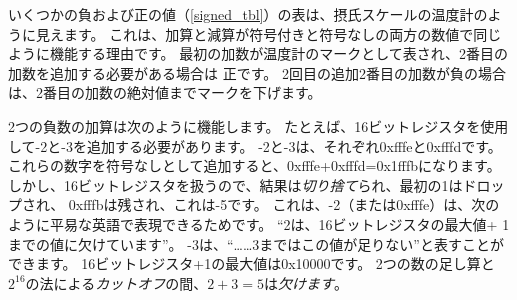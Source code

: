 いくつかの負および正の値（\ref{signed_tbl}）の表は、摂氏スケールの温度計のように見えます。
これは、加算と減算が符号付きと符号なしの両方の数値で同じように機能する理由です。
最初の加数が温度計のマークとして表され、2番目の加数を追加する必要がある場合は
正です。 
2回目の追加2番目の加数が負の場合は、2番目の加数の絶対値までマークを下げます。

2つの負数の加算は次のように機能します。
たとえば、16ビットレジスタを使用して-2と-3を追加する必要があります。 
-2と-3は、それぞれ0xfffeと0xfffdです。
これらの数字を符号なしとして追加すると、0xfffe+0xfffd=0x1fffbになります。
しかし、16ビットレジスタを扱うので、結果は\emph{切り捨て}られ、最初の1はドロップされ、
0xfffbは残され、これは-5です。
これは、-2（または0xfffe）は、次のように平易な英語で表現できるためです。
``2は、16ビットレジスタの最大値+ 1までの値に欠けています''。
-3は、``\dots…3まではこの値が足りない''と表すことができます。 
16ビットレジスタ+1の最大値は0x10000です。 
2つの数の足し算と$2^{16}$の法による\emph{カットオフ}の間、$2+3=5$は\emph{欠けます}。




